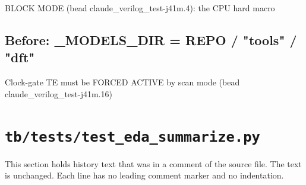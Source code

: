 \begin{record}
\begin{textblock}
BLOCK MODE (bead claude_verilog_test-j41m.4): the CPU hard macro
\end{textblock}

\subsection*{Before: \_MODELS\_DIR = REPO / "tools" / "dft"}

\begin{textblock}
Clock-gate TE must be FORCED ACTIVE by scan mode (bead claude_verilog_test-j41m.16)
\end{textblock}

\end{record}

\section{\texttt{tb/tests/test\_eda\_summarize.py}}\label{cr:suite:test-eda-summarize}

This section holds history text that was in a comment of the source file. The text is unchanged. Each line has no leading comment marker and no indentation.

